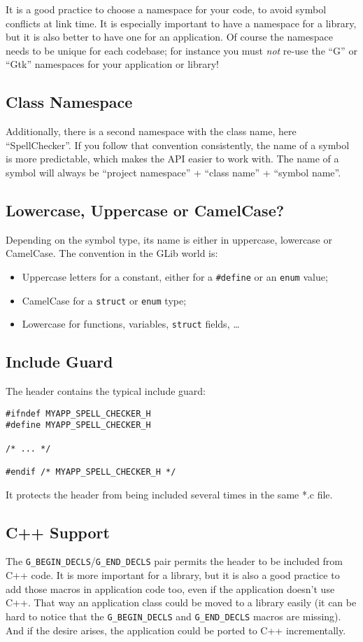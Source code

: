 It is a good practice to choose a namespace for your code, to avoid symbol conflicts at link time. It is especially important to have a namespace for a library, but it is also better to have one for an application. Of course the namespace needs to be unique for each codebase; for instance you must \emph{not} re-use the ``G'' or ``Gtk'' namespaces for your application or library!

\subsection{Class Namespace}
Additionally, there is a second namespace with the class name, here ``SpellChecker''. If you follow that convention consistently, the name of a symbol is more predictable, which makes the API easier to work with. The name of a symbol will always be ``project namespace'' + ``class name'' + ``symbol name''.

\subsection{Lowercase, Uppercase or CamelCase?}
Depending on the symbol type, its name is either in uppercase, lowercase or CamelCase. The convention in the GLib world is:
\begin{itemize}
  \item Uppercase letters for a constant, either for a \lstinline{#define} or an \lstinline{enum} value;
  \item CamelCase for a \lstinline{struct} or \lstinline{enum} type;
  \item Lowercase for functions, variables, \lstinline{struct} fields, …
\end{itemize}

\subsection{Include Guard}
The header contains the typical include guard:

\begin{lstlisting}
#ifndef MYAPP_SPELL_CHECKER_H
#define MYAPP_SPELL_CHECKER_H

/* ... */

#endif /* MYAPP_SPELL_CHECKER_H */
\end{lstlisting}

It protects the header from being included several times in the same *.c file.

\subsection{C++ Support}
The \lstinline{G_BEGIN_DECLS}/\lstinline{G_END_DECLS} pair permits the header to be included from C++ code. It is more important for a library, but it is also a good practice to add those macros in application code too, even if the application doesn't use C++. That way an application class could be moved to a library easily (it can be hard to notice that the \lstinline{G_BEGIN_DECLS} and \lstinline{G_END_DECLS} macros are missing). And if the desire arises, the application could be ported to C++ incrementally.

